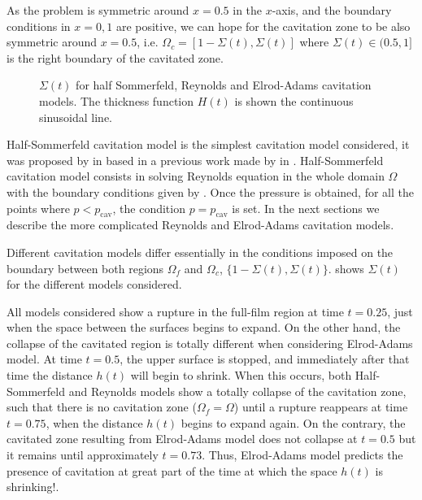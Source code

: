 As the problem is symmetric around $x=0.5$ in the $x$-axis, and the boundary conditions in $x=0,1$ are positive, we can hope for the cavitation zone to be also symmetric around $x=0.5$, i.e. $\Omega_c=[1-\Sigma(t),\Sigma(t)]$ where $\Sigma(t)\in (0.5,1]$ is the right boundary of the cavitated zone.
\begin{figure}[h!]
\centering 
\def\svgwidth{\textwidth}\footnotesize{
}\caption[Comparition of cavitation models for the a squeeze problem]{$\Sigma(t)$ for half Sommerfeld, Reynolds and Elrod-Adams cavitation models. The thickness function $H(t)$ is shown the continuous sinusoidal line.}\label{fig:squeeze_models_comparition}
\end{figure}

Half-Sommerfeld cavitation model is the simplest cavitation model considered, it was proposed by \citeauthor{gumbel1921} in \citeyear{gumbel1921} \cite{gumbel1921} based in a previous work made by \citeauthor{sommerfeld1904} in \citeyear{sommerfeld1904} \cite{sommerfeld1904}. Half-Sommerfeld cavitation model consists in solving Reynolds equation in the whole domain $\Omega$ with the boundary conditions given by . Once the pressure is obtained, for all the points where $p<p_\text{cav}$, the condition $p=p_\text{cav}$ is set. In the next sections we describe the more complicated Reynolds and Elrod-Adams cavitation models.

Different cavitation models differ essentially in the conditions imposed on the boundary between both regions $\Omega_f$ and $\Omega_c$, $\{1-\Sigma(t),\Sigma(t)\}$.  shows $\Sigma(t)$ for the different models considered.

All models considered show a rupture in the full-film region at time $t=0.25$, just when the space between the surfaces begins to expand. On the other hand, the collapse of the cavitated region is totally different when considering Elrod-Adams model. At time $t=0.5$, the upper surface is stopped, and immediately after that time the distance $h(t)$ will begin to shrink. When this occurs, both Half-Sommerfeld and Reynolds models show a totally collapse of the cavitation zone, such that there is no cavitation zone ($\Omega_f=\Omega$) until a rupture reappears at time $t=0.75$, when the distance $h(t)$ begins to expand again. On the contrary, the cavitated zone resulting from Elrod-Adams model does not collapse at $t=0.5$ but it remains until approximately $t=0.73$. Thus, Elrod-Adams model predicts the presence of cavitation at great part of the time at which the space $h(t)$ is shrinking!.
